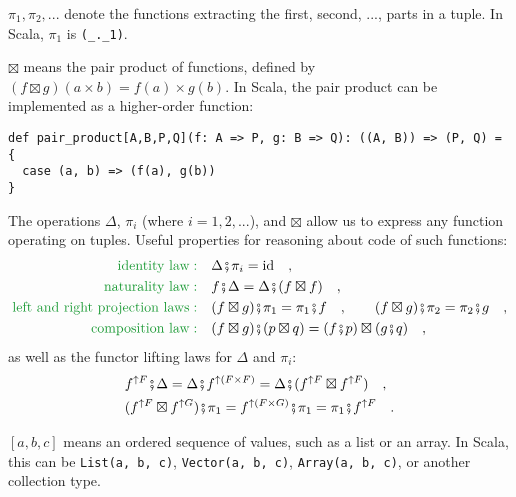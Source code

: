 $\pi_{1},\pi_{2},...$ denote the functions extracting the first,
second, ..., parts in a tuple. In Scala, $\pi_{1}$ is \lstinline!(_._1)!.

$\boxtimes$ means the pair product
of functions, defined by $(f\boxtimes g)(a\times b)=f(a)\times g(b)$.
In Scala, the pair product can be implemented as a higher-order function:
\begin{lstlisting}
def pair_product[A,B,P,Q](f: A => P, g: B => Q): ((A, B)) => (P, Q) = {
  case (a, b) => (f(a), g(b))
}
\end{lstlisting}
The operations $\Delta$, $\pi_{i}$ (where $i=1,2,...$), and $\boxtimes$
allow us to express any function operating on tuples. Useful properties
for reasoning about code of such functions: 
\begin{align*}
{\color{greenunder}\text{identity law}:}\quad & \Delta\bef\pi_{i}=\text{id}\quad,\\
{\color{greenunder}\text{naturality law}:}\quad & f\bef\Delta=\Delta\bef(f\boxtimes f)\quad,\\
{\color{greenunder}\text{left and right projection laws}:}\quad & (f\boxtimes g)\bef\pi_{1}=\pi_{1}\bef f\quad,\quad\quad(f\boxtimes g)\bef\pi_{2}=\pi_{2}\bef g\quad,\\
{\color{greenunder}\text{composition law}:}\quad & (f\boxtimes g)\bef(p\boxtimes q)=(f\bef p)\boxtimes(g\bef q)\quad,
\end{align*}
as well as the functor lifting laws for $\Delta$ and $\pi_{i}$:
\begin{align*}
 & f^{\uparrow F}\bef\Delta=\Delta\bef f^{\uparrow(F\times F)}=\Delta\bef(f^{\uparrow F}\boxtimes f^{\uparrow F})\quad,\\
 & (f^{\uparrow F}\boxtimes f^{\uparrow G})\bef\pi_{1}=f^{\uparrow(F\times G)}\bef\pi_{1}=\pi_{1}\bef f^{\uparrow F}\quad.
\end{align*}

$\left[a,b,c\right]$ means an ordered sequence of values, such as
a list or an array. In Scala, this can be \lstinline!List(a, b, c)!,
\lstinline!Vector(a, b, c)!, \lstinline!Array(a, b, c)!, or another
collection type.

